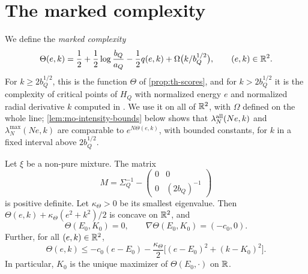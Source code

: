 \section{The marked complexity}\label{sec:mo-complexity}

We define the \emph{marked complexity}
\begin{equation}\label{eq:mo-Theta}
\Theta(e,k)=\frac12+\frac12\log\frac{b_Q}{a_Q}-\frac12q(e,k)+\Omega\bigl(k/b_Q^{1/2}\bigr),\qquad(e,k)\in\mathbb R^2.
\end{equation}
For $k\ge2b_Q^{1/2}$, this is the function $\Theta$ of \cref{prop:th-scores}, and for $k>2b_Q^{1/2}$ it is the complexity of critical points of $H_Q$ with normalized energy $e$ and normalized radial derivative $k$ computed in \cite[Theorem~5]{BenArousSubagZeitouni2020}. We use it on all of $\mathbb R^2$, with $\Omega$ defined on the whole line; \cref{lem:mo-intensity-bounds} below shows that $\lambda^{\rm all}_N(Ne,k)$ and $\lambda^{\max}_N(Ne,k)$ are comparable to $e^{N\Theta(e,k)}$, with bounded constants, for $k$ in a fixed interval above $2b_Q^{1/2}$.

\begin{lemma}\label{lem:mo-concavity}
Let $\xi$ be a non-pure mixture. The matrix
\begin{equation}\label{eq:mo-M}
M=\Sigma_Q^{-1}-\begin{pmatrix}0&0\\0&(2b_Q)^{-1}\end{pmatrix}
\end{equation}
is positive definite. Let $\kappa_\Theta>0$ be its smallest eigenvalue. Then $\Theta(e,k)+\kappa_\Theta(e^2+k^2)/2$ is concave on $\mathbb R^2$, and
\begin{equation}\label{eq:mo-saddle}
\Theta(E_0,K_0)=0,\qquad\nabla\Theta(E_0,K_0)=(-c_0,0).
\end{equation}
Further, for all $(e,k)\in\mathbb R^2$,
\begin{equation}\label{eq:mo-global-loss}
\Theta(e,k)\le-c_0(e-E_0)-\frac{\kappa_\Theta}2\bigl[(e-E_0)^2+(k-K_0)^2\bigr].
\end{equation}
In particular, $K_0$ is the unique maximizer of $\Theta(E_0,\cdot)$ on $\mathbb R$.
\end{lemma}

